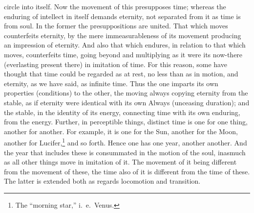 \documentclass{article}
\begin{document}
circle into itself. Now the movement of this presupposes time; whereas the enduring of intellect in itself demands eternity, not separated from it as time is from soul. In the former the presuppositions are united. That which moves counterfeits eternity, by the mere immeasurableness of its movement producing an impression of eternity. And also that which endures, in relation to that which moves, counterfeits time, going beyond and multiplying as it were its now-there (everlasting present there) in imitation of time. For this reason, some have thought that time could be regarded as at rest, no less than as in motion, and eternity, as we have said, as infinite time. Thus the one imparts its own properties (conditions) to the other, the moving always copying eternity from the stable, as if eternity were identical with its own Always (unceasing duration); and the stable, in the identity of its energy, connecting time with its own enduring, from the energy. Further, in perceptible things, distinct time is one for one thing, another for another. For example, it is one for the Sun, another for the Moon, another for Lucifer,\footnote{The ``morning star,'' i.~e.~Venus.} and so forth. Hence one has one year, another another. And the year that includes these is consummated in the motion of the soul, inasmuch as all other things move in imitation of it. The movement of it being different from the movement of these, the time also of it is different from the time of these. The latter is extended both as regards locomotion and transition.
\end{document}
